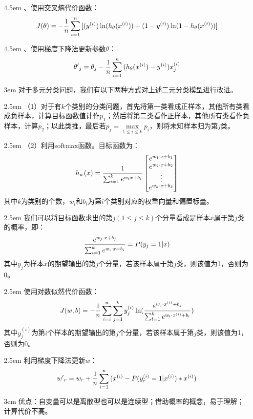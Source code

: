 \documentclass[a4paper, 11pt]{article}
\begin{document}
\begin{CJK*}{GBK}{song}
\hangindent 4.5em
\quad\quad{}、使用交叉熵代价函数：
$$J(\theta ) =  - {1 \over n}\sum\limits_{i = 1}^n {[({y^{(i)}})} \ln ({h_\theta }({x^{(i)}})) + (1 - {y^{(i)}})\ln (1 - {h_\theta }({x^{(i)}}))]$$

\hangindent 4.5em
\quad\quad{}、使用梯度下降法更新参数$\theta$：
$${{\theta '}_j} = {\theta _j} - {1 \over n}\sum\limits_{i = 1}^n {({h_\theta }({x^{(i)}}) - {y^{(i)}})} x_j^{(i)}$$

\hangindent 3em
对于多元分类问题，我们有以下两种方式对上述二元分类模型进行改进。

\hangindent 2.5em
（1）对于有$k$个类别的分类问题，首先将第一类看成正样本，其他所有类看成负样本，计算目标函数值计作$p_1$；然后将第二类看作正样本，其他所有类看作负样本，计算$p_2$；以此类推，最后若${p_j} = \mathop {\max }\limits_{1 \le i \le k} {p_i}$，则将未知样本归为第$j$类。

\hangindent 2.5em
（2）利用softmax函数。目标函数为：
$${h_w}(x) = {1 \over {\sum\nolimits_{i = 1}^k {{e^{{w_i}x + {b_i}}}} }}
\left[\begin{matrix}
e^{{w_1} \cdot x + {b_1}}\\
e^{{w_2} \cdot x + {b_2}}\\
\vdots\\
e^{{w_k} \cdot x + {b_k}}
\end{matrix}\right]
$$
其中$k$为类别的个数，${w_i}$和$b_i$为第$i$个类别对应的权重向量和偏置标量。

\hangindent 2.5em
我们可以将目标函数求出的第$j(1 \le j \le k)$个分量看成是样本$x$属于第$j$类的概率，即：
$${{{e^{{w_j} \cdot x + {b_j}}}} \over {\sum\nolimits_{i = 1}^k {{e^{{w_i} \cdot x + {b_i}}}} }} = P({y_j} = 1|x)$$
其中${y_j}$为样本$x$的期望输出的第$j$个分量，若该样本属于第$j$类，则该值为1，否则为0。

\hangindent 2.5em
使用对数似然代价函数：
$$J(w,b) =  - {1 \over n}\sum\limits_{i = i}^n {\sum\limits_{j = 1}^k {y_j^{(i)}\ln } } ({{{e^{{w_j}\cdot{x^{(i)}} + {b_j}}}} \over {\sum\nolimits_{l = 1}^k {{e^{{w_l}\cdot{x^{(i)}} + {b_l}}}} }})$$
其中${y_j^{(i)}}$为第$i$个样本的期望输出的第$j$个分量，若该样本属于第$j$类，则该值为1，否则为0。

\hangindent 2.5em
利用梯度下降法更新$w$：
$${{w'}_r} = {w_r} + {1 \over n}\sum\limits_{i = 1}^n {({x^{(i)}} - P(y_r^{(i)} = 1|{x^{(i)}})*{x^{(i)}})} $$

\hangindent 3em
优点：自变量可以是离散型也可以是连续型；借助概率的概念，易于理解；计算代价不高。


\end{CJK*}
\end{document}
